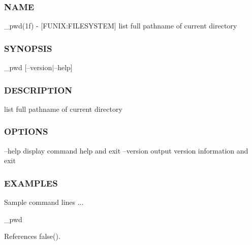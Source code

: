 \subsubsection*{N\+A\+ME}

\+\_\+pwd(1f) -\/ \mbox{[}F\+U\+N\+IX\+:F\+I\+L\+E\+S\+Y\+S\+T\+EM\mbox{]} list full pathname of current directory \subsubsection*{S\+Y\+N\+O\+P\+S\+IS}

\+\_\+pwd \mbox{[}--version$\vert$--help\mbox{]} \subsubsection*{D\+E\+S\+C\+R\+I\+P\+T\+I\+ON}

list full pathname of current directory \subsubsection*{O\+P\+T\+I\+O\+NS}

--help display command help and exit --version output version information and exit \subsubsection*{E\+X\+A\+M\+P\+L\+ES}

Sample command lines ... \begin{DoxyVerb}   _pwd \end{DoxyVerb}
 

References false().

